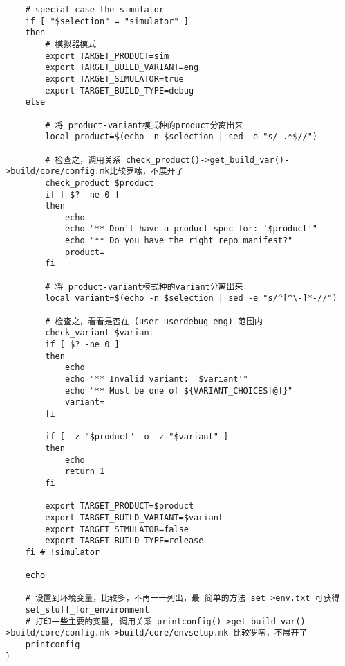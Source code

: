 \documentclass[12pt,a4paper]{article}
\begin{document}
\begin{verbatim}
    # special case the simulator
    if [ "$selection" = "simulator" ]
    then
        # 模拟器模式
        export TARGET_PRODUCT=sim
        export TARGET_BUILD_VARIANT=eng
        export TARGET_SIMULATOR=true
        export TARGET_BUILD_TYPE=debug
    else

        # 将 product-variant模式种的product分离出来
        local product=$(echo -n $selection | sed -e "s/-.*$//")

        # 检查之，调用关系 check_product()->get_build_var()->build/core/config.mk比较罗嗦，不展开了
        check_product $product
        if [ $? -ne 0 ]
        then
            echo
            echo "** Don't have a product spec for: '$product'"
            echo "** Do you have the right repo manifest?"
            product=
        fi

        # 将 product-variant模式种的variant分离出来
        local variant=$(echo -n $selection | sed -e "s/^[^\-]*-//")

        # 检查之，看看是否在 (user userdebug eng) 范围内
        check_variant $variant
        if [ $? -ne 0 ]
        then
            echo
            echo "** Invalid variant: '$variant'"
            echo "** Must be one of ${VARIANT_CHOICES[@]}"
            variant=
        fi

        if [ -z "$product" -o -z "$variant" ]
        then
            echo
            return 1
        fi

        export TARGET_PRODUCT=$product
        export TARGET_BUILD_VARIANT=$variant
        export TARGET_SIMULATOR=false
        export TARGET_BUILD_TYPE=release
    fi # !simulator

    echo

    # 设置到环境变量，比较多，不再一一列出，最 简单的方法 set >env.txt 可获得
    set_stuff_for_environment
    # 打印一些主要的变量, 调用关系 printconfig()->get_build_var()->build/core/config.mk->build/core/envsetup.mk 比较罗嗦，不展开了
    printconfig
}
\end{verbatim}
\label{4_2}
\end{document}
